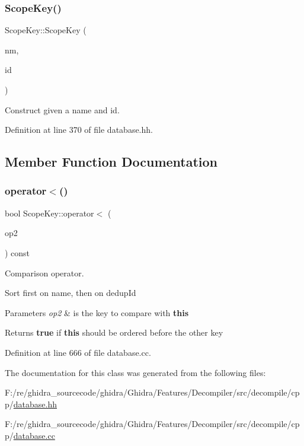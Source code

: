 \subsubsection{\texorpdfstring{ScopeKey()}{ScopeKey()}}
{\footnotesize\ttfamily Scope\+Key\+::\+Scope\+Key (\begin{DoxyParamCaption}\item[{const string \&}]{nm,  }\item[{uint4}]{id }\end{DoxyParamCaption})\hspace{0.3cm}{\ttfamily [inline]}}



Construct given a name and id. 



Definition at line 370 of file database.\+hh.



\subsection{Member Function Documentation}
\mbox{\label{class_scope_key_ad94de9bdec99a5a642a7c7d7f5b6b5ab}} 
\subsubsection{\texorpdfstring{operator$<$()}{operator<()}}
{\footnotesize\ttfamily bool Scope\+Key\+::operator$<$ (\begin{DoxyParamCaption}\item[{const \mbox{\hyperlink{class_scope_key}{Scope\+Key}} \&}]{op2 }\end{DoxyParamCaption}) const}



Comparison operator. 

Sort first on name, then on dedup\+Id 
\begin{DoxyParams}{Parameters}
{\em op2} & is the key to compare with {\bfseries{this}} \\
\hline
\end{DoxyParams}
\begin{DoxyReturn}{Returns}
{\bfseries{true}} if {\bfseries{this}} should be ordered before the other key 
\end{DoxyReturn}


Definition at line 666 of file database.\+cc.



The documentation for this class was generated from the following files\+:\begin{DoxyCompactItemize}
\item 
F\+:/re/ghidra\+\_\+sourcecode/ghidra/\+Ghidra/\+Features/\+Decompiler/src/decompile/cpp/\mbox{\hyperlink{database_8hh}{database.\+hh}}\item 
F\+:/re/ghidra\+\_\+sourcecode/ghidra/\+Ghidra/\+Features/\+Decompiler/src/decompile/cpp/\mbox{\hyperlink{database_8cc}{database.\+cc}}\end{DoxyCompactItemize}
